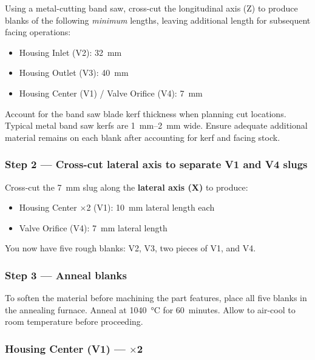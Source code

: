 \documentclass[12pt, letterpaper]{report}%
\newcounter{mycounter}           %
\newcounter{sub}[mycounter]      %
\begin{document}
Using a metal-cutting band saw, cross-cut the longitudinal axis (Z) to produce blanks
of the following \textit{minimum} lengths, leaving additional length for subsequent
facing operations:

\begin{itemize}[itemsep=2pt]
	\item Housing Inlet (V2): \SI{32}{\milli\meter} 
	\item Housing Outlet (V3): \SI{40}{\milli\meter}
	\item Housing Center (V1) / Valve Orifice (V4): \SI{7}{\milli\meter}
\end{itemize}

\begin{notebox}
Account for the band saw blade kerf thickness when planning cut locations.
Typical metal band saw kerfs are \SIrange{1}{2}{\milli\meter} wide. Ensure adequate
additional material remains on each blank after accounting for kerf and facing stock.
\end{notebox}

\subsubsection*{Step 2 --- Cross-cut lateral axis to separate V1 and V4 slugs}

Cross-cut the 7~mm slug along the \textbf{lateral axis (X)} to produce:

\begin{itemize}[itemsep=2pt]
	\item Housing Center $\times$2 (V1): \SI{10}{\milli\meter} lateral length each
	\item Valve Orifice (V4): \SI{7}{\milli\meter} lateral length
\end{itemize}

You now have five rough blanks: V2, V3, two pieces of V1, and V4.

\subsubsection*{Step 3 --- Anneal blanks}

To soften the material before machining the part features,
place all five blanks in the annealing furnace. Anneal at \SI{1040}{\degreeCelsius} for
60~minutes. Allow to air-cool to room temperature before proceeding.

\subsubsection{Housing Center (V1) --- $\times$2}
\label{sec:mfg:V1}
\end{document}
